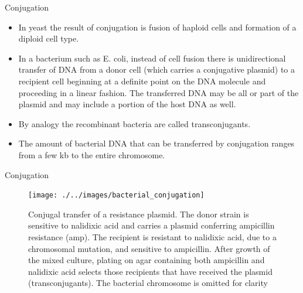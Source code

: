 \documentclass[ignorenonframetext,aspectratio=169]{beamer}
\providecommand{\tightlist}{%
  \setlength{\itemsep}{0pt}\setlength{\parskip}{0pt}}
\begin{document}
\begin{frame}{Conjugation}
\protect\hypertarget{conjugation}{}

\begin{itemize}
\tightlist
\item
  In yeast the result of conjugation is fusion of haploid cells and
  formation of a diploid cell type.
\item
  In a bacterium such as E. coli, instead of cell fusion there is
  unidirectional transfer of DNA from a donor cell (which carries a
  conjugative plasmid) to a recipient cell beginning at a definite point
  on the DNA molecule and proceeding in a linear fashion. The
  transferred DNA may be all or part of the plasmid and may include a
  portion of the host DNA as well.
\item
  By analogy the recombinant bacteria are called transconjugants.
\item
  The amount of bacterial DNA that can be transferred by conjugation
  ranges from a few kb to the entire chromosome.
\end{itemize}

\end{frame}

\begin{frame}{Conjugation}
\protect\hypertarget{conjugation-1}{}

\begin{figure}
\texttt{[image: ./../images/bacterial\_conjugation]} \caption{Conjugal transfer of a resistance plasmid. The donor strain is sensitive to nalidixic acid and carries a plasmid conferring ampicillin resistance (amp). The recipient is resistant to nalidixic acid, due to a chromosomal mutation, and sensitive to ampicillin. After growth of the mixed culture, plating on agar containing both ampicillin and nalidixic acid selects those recipients that have received the plasmid (transconjugants). The bacterial chromosome is omitted for clarity}\label{fig:conjugation}
\end{figure}

\end{frame}
\end{document}
